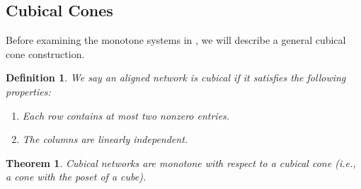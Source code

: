 \documentclass{article}
\newtheorem{thm}{Theorem}
\newtheorem{define}{Definition}
\begin{document}
\subsection{Cubical Cones}
\label{sec:cubical_cones}

Before examining the monotone systems in \cite{BANAJI20131359}, we will describe a general cubical cone construction.

\begin{define}
    We say an aligned network is \textit{cubical} if it satisfies the following properties:
    \begin{enumerate}
        \item Each row contains at most two nonzero entries.
        \item The columns are linearly independent.
    \end{enumerate}
\end{define}

\begin{thm}
\label{thm:cubical network cones}
    Cubical networks are monotone with respect to a cubical cone (i.e., a cone with the poset of a cube). 
\end{thm}
\end{document}
